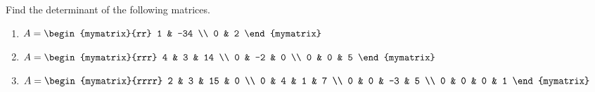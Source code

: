 \begin{enumialphparenastyle}

\begin{ex} Find the determinant of the following matrices.

\begin{enumerate}
\item 
$A = \begin{mymatrix}{rr}
1 & -34 \\
0 & 2 
\end{mymatrix} $

\item 
$A = \begin{mymatrix}{rrr}
4 & 3 & 14 \\
 0 & -2 & 0 \\
0 & 0 & 5 
\end{mymatrix}$

\item 
$A = \begin{mymatrix}{rrrr}
2 & 3 & 15 & 0 \\
0 & 4 & 1 & 7 \\
0 & 0 & -3 & 5 \\
0 & 0 & 0 & 1 
\end{mymatrix}$
\end{enumerate}


\end{ex}

\end{enumialphparenastyle}